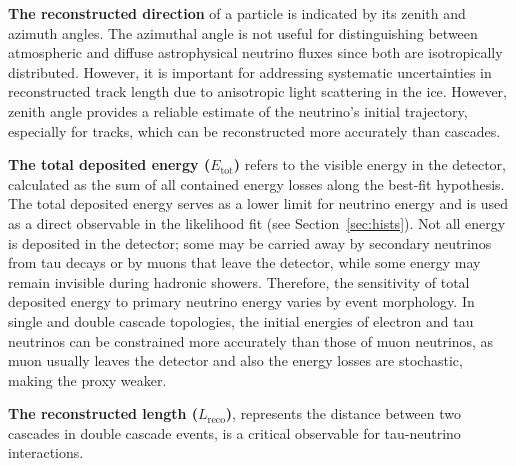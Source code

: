 \textbf{The reconstructed direction} of a particle is indicated by its zenith and azimuth angles. The azimuthal angle is not useful for distinguishing between atmospheric and diffuse astrophysical neutrino fluxes since both are isotropically distributed. However, it is important for addressing systematic uncertainties in reconstructed track length due to anisotropic light scattering in the ice. However, zenith angle provides a reliable estimate of the neutrino's initial trajectory, especially for tracks, which can be reconstructed more accurately than cascades.


\textbf{The total deposited energy ($E_{\text{tot}}$)} refers to the visible energy in the detector, calculated as the sum of all contained energy losses along the best-fit hypothesis. The total deposited energy serves as a lower limit for neutrino energy and is used as a direct observable in the likelihood fit (see Section~\ref{sec:hists}). Not all energy is deposited in the detector; some may be carried away by secondary neutrinos from tau decays or by muons that leave the detector, while some energy may remain invisible during hadronic showers. Therefore, the sensitivity of total deposited energy to primary neutrino energy varies by event morphology. In single and double cascade topologies, the initial energies of electron and tau neutrinos can be constrained more accurately than those of muon neutrinos, as muon usually leaves the detector and also the energy losses are stochastic, making the proxy weaker. 

\textbf{The reconstructed length ($L_{\mathrm{reco}}$)}, represents the distance between two cascades in double cascade events, is a critical observable for tau-neutrino interactions. 

